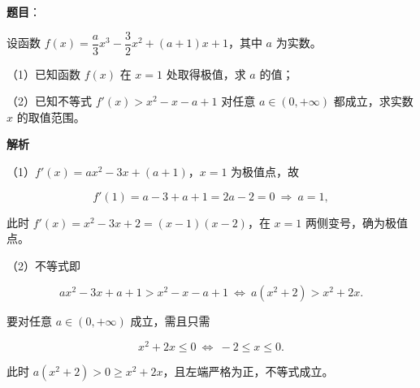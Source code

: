 \begin{answer}

\textbf{题目}：

设函数 $f(x)=\dfrac a3x^3-\dfrac32x^2+(a+1)x+1$，其中 $a$ 为实数。

（1）已知函数 $f(x)$ 在 $x=1$ 处取得极值，求 $a$ 的值；

（2）已知不等式 $f'(x)>x^2-x-a+1$ 对任意 $a\in(0,+\infty)$ 都成立，求实数 $x$ 的取值范围。

\textbf{解析}

（1）$f'(x)=ax^2-3x+(a+1)$，$x=1$ 为极值点，故

\nopagebreak[4]
\[f'(1)=a-3+a+1=2a-2=0\ \Longrightarrow\ a=1,\]

此时 $f'(x)=x^2-3x+2=(x-1)(x-2)$，在 $x=1$ 两侧变号，确为极值点。

（2）不等式即

\nopagebreak[4]
\[ax^2-3x+a+1>x^2-x-a+1\ \Longleftrightarrow\ a(x^2+2)>x^2+2x.\]

要对任意 $a\in(0,+\infty)$ 成立，需且只需

\nopagebreak[4]
\[x^2+2x\leqslant0\ \Longleftrightarrow\ -2\leqslant x\leqslant0.\]

此时 $a(x^2+2)>0\geqslant x^2+2x$，且左端严格为正，不等式成立。


\end{answer}
